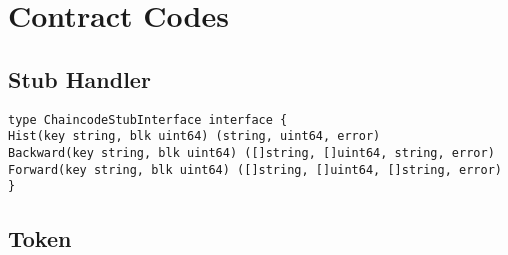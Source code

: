 \chapter{Contract Codes}
\label{sec:append:contracts}
\section{Stub Handler}
\label{sec:append:contracts:stub}


\begin{lstlisting}
type ChaincodeStubInterface interface {
Hist(key string, blk uint64) (string, uint64, error)
Backward(key string, blk uint64) ([]string, []uint64, string, error)
Forward(key string, blk uint64) ([]string, []uint64, []string, error)
}
\end{lstlisting}

\section{Token}
\label{sec:append:contracts:token}


